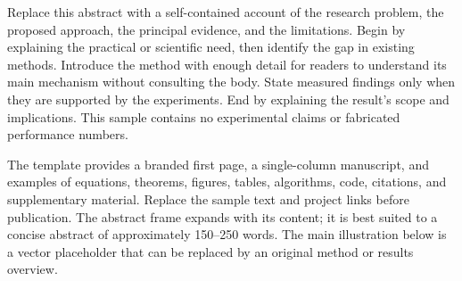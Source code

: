 Replace this abstract with a self-contained account of the research problem,
the proposed approach, the principal evidence, and the limitations. Begin by
explaining the practical or scientific need, then identify the gap in existing
methods. Introduce the method with enough detail for readers to understand its
main mechanism without consulting the body. State measured findings only when
they are supported by the experiments. End by explaining the result's scope
and implications. This sample contains no experimental claims or fabricated
performance numbers.

The template provides a branded first page, a single-column manuscript, and
examples of equations, theorems, figures, tables, algorithms, code, citations,
and supplementary material. Replace the sample text and project links before
publication. The abstract frame expands with its content; it is best suited
to a concise abstract of approximately 150--250 words. The main illustration
below is a vector placeholder that can be replaced by an original method or
results overview.
